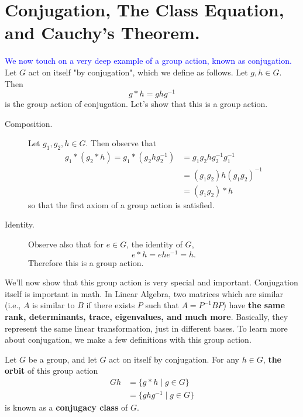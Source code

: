 \documentclass[12pt,letterpaper]{algebra_book}
\theoremstyle{definition}
\begin{document}
    \newpage
    \section{Conjugation, The Class Equation, and Cauchy's Theorem.}
    \textcolor{blue}{We now touch on a very deep example of a group action, known as
    conjugation.} Let $G$ act on itself "by conjugation", which we define
    as follows. Let $g, h \in G$. Then 
    \[
        g * h = ghg^{-1}
    \]
    is the group action of conjugation.
    Let's show that this is a group action. 
    \begin{description}
        \item[Composition.] Let $g_1, g_2, h \in G$. Then observe that
        \begin{align*}
            g_1 * (g_2 * h) = g_1 * (g_2hg_2^{-1}) &= g_1g_2 h g_2^{-1}g_1^{-1} \\
            & = (g_1g_2) h (g_1g_2)^{-1} \\
            & = (g_1g_2) * h
        \end{align*}
        so that the first axiom of a group action is satisfied.
        \item[Identity.]
        Observe also that for $e \in G$, the identity of $G$, 
        \[
            e * h = ehe^{-1} = h.
        \]
        Therefore this is a group action.
    \end{description}

    We'll now show that this group action is very special and
    important. Conjugation itself is important in math. In Linear
    Algebra, two matrices which are similar (i.e., $A$ is similar to
    $B$ if there exists $P$ such that $A = P^{-1}BP$) have \textbf{the same 
    rank, determinants, trace, eigenvalues, and much more}. Basically,
    they represent the same linear transformation, just in different
    bases. To learn more about conjugation, we make a few definitions
    with this group action.

    \begin{definition}
        Let $G$ be a group, and let $G$ act on itself by conjugation.
        For any $h \in G$, \textbf{the orbit} of this group action
        \begin{align*}
            Gh & = \{g * h \mid g \in G\} \\
            & = \{ghg^{-1} \mid g \in G\}
        \end{align*}
        is known as a \textbf{conjugacy class} of $G$.
    \end{definition}
\end{document}
